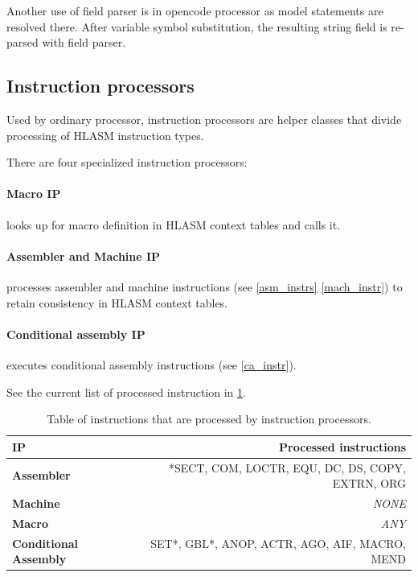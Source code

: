 Another use of field parser is in opencode processor as model statements are resolved there. After variable symbol substitution, the resulting string field is re-parsed with field parser.

\subsection{Instruction processors}

Used by ordinary processor, instruction processors are helper classes that divide processing of HLASM instruction types.

There are four specialized instruction processors:
\paragraph*{Macro IP} looks up for macro definition in HLASM context tables and calls it.
\paragraph*{Assembler and Machine IP} processes assembler and machine instructions (see \cref{asm_instrs} \cref{mach_instr}) to retain consistency in HLASM context tables.

\paragraph*{Conditional assembly IP} executes conditional assembly instructions (see \cref{ca_instr}). 

\vspace{5mm}

See the current list of processed instruction in \cref{tab06:instr_proc}.

\begin{table}
	\centering
	\begin{tabular}{lr}
		\textbf{IP}                   &                  \textbf{Processed instructions} \\ \toprule
		\textbf{Assembler}            & *SECT, COM, LOCTR, EQU, DC, DS, COPY, EXTRN, ORG \\
		\textbf{Machine}              &                                      \emph{NONE} \\
		\textbf{Macro}                &                                       \emph{ANY} \\
		\textbf{Conditional Assembly} &    SET*, GBL*, ANOP, ACTR, AGO, AIF, MACRO, MEND \\ \bottomrule
	\end{tabular}
	\caption{Table of instructions that are processed by instruction processors.}
	\label{tab06:instr_proc}
\end{table}

